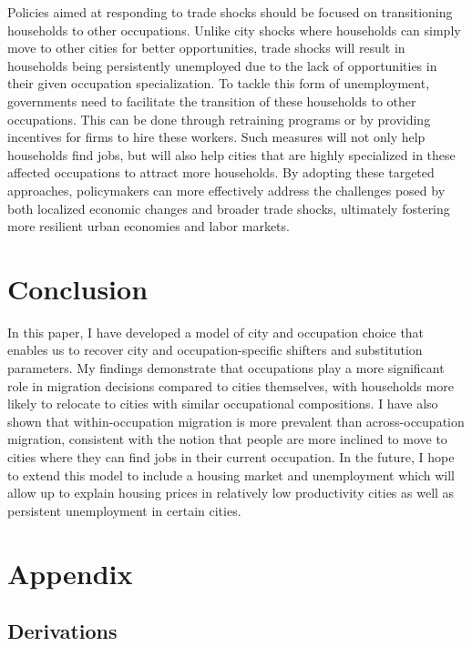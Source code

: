 \documentclass[10pt]{article}
\begin{document}
Policies aimed at responding to trade shocks should be focused on transitioning households to other occupations. Unlike city shocks where households can simply move to other cities for better opportunities, trade shocks will result in households being persistently unemployed due to the lack of opportunities in their given occupation specialization. To tackle this form of unemployment, governments need to facilitate the transition of these households to other occupations. This can be done through retraining programs or by providing incentives for firms to hire these workers. Such measures will not only help households find jobs, but will also help cities that are highly specialized in these affected occupations to attract more households. By adopting these targeted approaches, policymakers can more effectively address the challenges posed by both localized economic changes and broader trade shocks, ultimately fostering more resilient urban economies and labor markets.

\section{Conclusion}

In this paper, I have developed a model of city and occupation choice that enables us to recover city and occupation-specific shifters and substitution parameters. My findings demonstrate that occupations play a more significant role in migration decisions compared to cities themselves, with households more likely to relocate to cities with similar occupational compositions. I have also shown that within-occupation migration is more prevalent than across-occupation migration, consistent with the notion that people are more inclined to move to cities where they can find jobs in their current occupation. In the future, I hope to extend this model to include a housing market and unemployment which will allow up to explain housing prices in relatively low productivity cities as well as persistent unemployment in certain cities.

\newpage


\newpage

\section{Appendix}

\subsection{Derivations}
\end{document}
